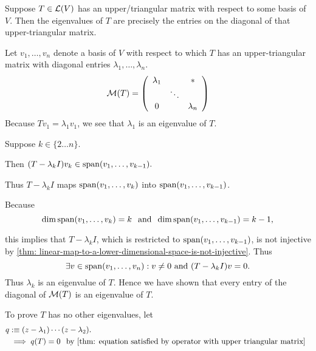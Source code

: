 \begin{thm}
  \label{thm:determination-of-eigenvalue-from-upper-triangular-matrix}
  Suppose $T\in \mathcal{L}(V)$ has an upper\-/triangular matrix with respect to some basis of $V$. Then the eigenvalues of $T$ are precisely the entries on the diagonal of that upper-triangular matrix.

\end{thm}
\begin{prf}
  Let $v_1, \ldots, v_n$ denote a basis of $V$ with respect to which $T$ has an upper-triangular matrix with diagonal entries $\lambda_1, \ldots, \lambda_n$.
  \begin{equation}
    \mathcal{M}(T) =
    \left( {\begin{array}{ccc}
        \lambda_1 &         &  * \\
        &  \ddots &    \\
        0      &         & \lambda_n
    \end{array} } \right)
  \end{equation}
  Because $T v_1 = \lambda_1 v_1$, we see that $\lambda_1$ is an eigenvalue of $T$.

  Suppose $k \in \{2 \ldots n\}.$

  Then $(T-\lambda_k I) v_k \in \operatorname{span} (v_1, \ldots, v_{k-1}).$

  Thus $T-\lambda_k I$ maps $\operatorname{span} (v_1, \ldots, v_k)$ into $\operatorname{span} (v_1, \ldots, v_{k-1})$.

  Because
  \begin{equation}
    \dim \operatorname{span} (v_1, \ldots, v_k) = k \;\;\, \text{and}\;\; \dim \operatorname{span} (v_1, \ldots, v_{k-1}) = k-1,
  \end{equation}

  this implies that $T-\lambda_k I$, which is restricted to $\operatorname{span} (v_1, \ldots, v_{k-1})$, is not injective by \autoref{thm: linear-map-to-a-lower-dimensional-space-is-not-injective}. Thus
  \begin{equation}
    \exists v \in \myspan{v_1, \ldots, v_n}: v\neq0$ and $(T-\lambda_k I)v=0.
  \end{equation}
  Thus $\lambda_k$ is an eigenvalue of $T$. Hence we have shown that every entry of the diagonal of $\mathcal{M}(T)$ is an eigenvalue of $T$.

  To prove $T$ has no other eigenvalues, let
  \begin{equation}
    \begin{aligned}
      q &:\equiv (z-\lambda_1) \cdots (z-\lambda_2). \\
      &\implies q(T) = 0 \;\;\, \text{by \ref{thm: equation satisfied by operator with upper triangular matrix}}\;\;
    \end{aligned}
  \end{equation}


\end{prf}
